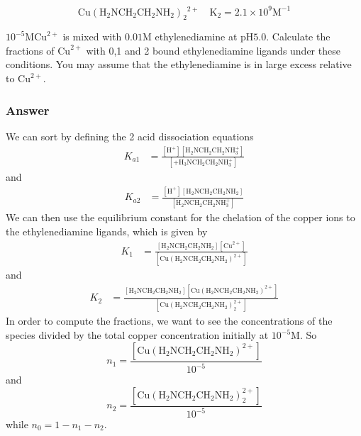 \documentclass[12pt]{article}
\begin{document}
$$
\mathrm{Cu}\left(\mathrm{H}_{2} \mathrm{NCH}_{2} \mathrm{CH}_{2} \mathrm{NH}_{2}\right)_{2}{ }^{2+} \quad \mathrm{K}_{2}=2.1 \times 10^{9} \mathrm{M}^{-1}
$$

$10^{-5} \mathrm{M} \mathrm{Cu}^{2+}$ is mixed with $0.01 \mathrm{M}$ ethylenediamine at $\mathrm{pH} 5.0$. Calculate the fractions of $\mathrm{Cu}^{2+}$ with 0,1 and 2 bound ethylenediamine ligands under these conditions. You may assume that the ethylenediamine is in large excess relative to $\mathrm{Cu}^{2+}$.
\subsubsection{Answer}
We can sort by defining the 2 acid dissociation equations
\begin{equation}
\begin{aligned}
K_{a 1} &=\frac{\left[\mathrm{H}^{+}\right]\left[\mathrm{H}_{2} \mathrm{NCH}_{2} \mathrm{CH}_{2} \mathrm{NH}_{3}^{+}\right]}{\left[+\mathrm{H}_{3} \mathrm{NCH}_{2} \mathrm{CH}_{2} \mathrm{NH}_{3}^{+}\right]}
\end{aligned}
\end{equation}
and 
\begin{equation}
\begin{aligned}
K_{a 2} &=\frac{\left[\mathrm{H}^{+}\right]\left[\mathrm{H}_{2} \mathrm{NCH}_{2} \mathrm{CH}_{2} \mathrm{NH}_{2}\right]}{\left[\mathrm{H}_{2} \mathrm{NCH}_{2} \mathrm{CH}_{2} \mathrm{NH}_{3}^{+}\right]}
\end{aligned}
\end{equation}
We can then use the equilibrium constant for the chelation of the copper ions to the ethylenediamine ligands, which is given by
\begin{equation}
\begin{aligned}
K_{1} &=\frac{\left[\mathrm{H}_{2} \mathrm{NCH}_{2} \mathrm{CH}_{2} \mathrm{NH}_{2}\right]\left[\mathrm{Cu}^{2+}\right]}{\left[\mathrm{Cu}\left(\mathrm{H}_{2} \mathrm{NCH}_{2} \mathrm{CH}_{2} \mathrm{NH}_{2}\right)^{2+}\right]}
\end{aligned}
\end{equation}
and
\begin{equation}
\begin{aligned}
K_{2} &=\frac{\left[\mathrm{H}_{2} \mathrm{NCH}_{2} \mathrm{CH}_{2} \mathrm{NH}_{2}\right]\left[\mathrm{Cu}\left(\mathrm{H}_{2} \mathrm{NCH}_{2} \mathrm{CH}_{2} \mathrm{NH}_{2}\right)^{2+}\right]}{\left[\mathrm{Cu}\left(\mathrm{H}_{2} \mathrm{NCH}_{2} \mathrm{CH}_{2} \mathrm{NH}_{2}\right)_{2}^{2+}\right]}
\end{aligned}
\end{equation}
In order to compute the fractions, we want to see the concentrations of the species divided by the total copper concentration initially at $10^{-5} \mathrm{M}$. So
\begin{equation}
  n_1 = \frac{[\mathrm{Cu}(\mathrm{H}_2\mathrm{NCH}_2\mathrm{CH}_2\mathrm{NH}_2)^{2+}]}{10^{-5}}
\end{equation}
and
\begin{equation}
  n_2 = \frac{[\mathrm{Cu}(\mathrm{H}_2\mathrm{NCH}_2\mathrm{CH}_2\mathrm{NH}_2)_{2}^{2+}]}{10^{-5}}
\end{equation}
while $n_0 = 1 - n_1 - n_2$.
\end{document}
